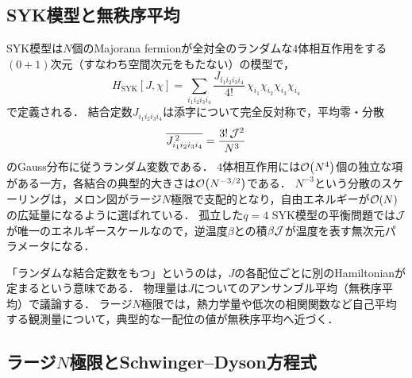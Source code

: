 \documentclass[a4paper,11pt,onecolumn]{jlreq}
\begin{document}
\subsection{SYK模型と無秩序平均}
\label{sec:syk_model}

SYK模型は$N$個のMajorana fermionが全対全のランダムな$4$体相互作用をする$(0+1)$次元（すなわち空間次元をもたない）の模型で，
\begin{equation}
  H_{\mathrm{SYK}}[J,\chi]
  = \sum_{i_1 i_2 i_3 i_4}\frac{J_{i_1 i_2 i_3 i_4}}{4!}\,
    \chi_{i_1}\chi_{i_2}\chi_{i_3}\chi_{i_4}
  \label{eq:syk_hamiltonian}
\end{equation}
で定義される\cite{SachdevYe1993,MaldacenaStanford2016}．
結合定数$J_{i_1i_2i_3i_4}$は添字について完全反対称で，平均零・分散
\begin{equation}
  \overline{J_{i_1i_2i_3i_4}^{\,2}} = \frac{3!\,\mathcal{J}^2}{N^3}
  \label{eq:syk_variance}
\end{equation}
のGauss分布に従うランダム変数である．
$4$体相互作用には$\order{N^4}$個の独立な項がある一方，各結合の典型的大きさは$\order{N^{-3/2}}$である．
$N^{-3}$という分散のスケーリングは，メロン図がラージ$N$極限で支配的となり，自由エネルギーが$\order{N}$の広延量になるように選ばれている\cite{MaldacenaStanford2016}．
孤立した$q=4$ SYK模型の平衡問題では$\mathcal{J}$が唯一のエネルギースケールなので，逆温度$\beta$との積$\beta\mathcal{J}$が温度を表す無次元パラメータになる．

「ランダムな結合定数をもつ」というのは，$J$の各配位ごとに別のHamiltonianが定まるという意味である．
物理量は$J$についてのアンサンブル平均（無秩序平均）で議論する．
ラージ$N$極限では，熱力学量や低次の相関関数など自己平均する観測量について，典型的な一配位の値が無秩序平均へ近づく．

\subsection{ラージ\texorpdfstring{$N$}{N}極限とSchwinger--Dyson方程式}
\label{sec:syk_sd}
\end{document}
